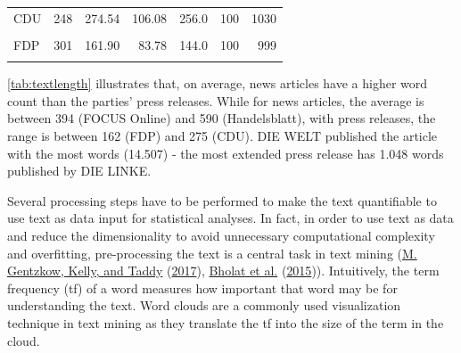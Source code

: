 \documentclass[
  12pt,
]{article}
\begin{document}
\begin{table}[H]
\begin{tabular}[t]{lrrrrrr}
\hspace{1em}CDU & 248 & 274.54 & 106.08 & 256.0 & 100 & 1030\\
\hspace{1em}\cellcolor{gray!6}{DIE LINKE} & \cellcolor{gray!6}{686} & \cellcolor{gray!6}{200.47} & \cellcolor{gray!6}{71.78} & \cellcolor{gray!6}{190.0} & \cellcolor{gray!6}{101} & \cellcolor{gray!6}{1048}\\
\hspace{1em}FDP & 301 & 161.90 & 83.78 & 144.0 & 100 & 999\\
\hspace{1em}\cellcolor{gray!6}{SPD} & \cellcolor{gray!6}{315} & \cellcolor{gray!6}{213.41} & \cellcolor{gray!6}{56.16} & \cellcolor{gray!6}{208.0} & \cellcolor{gray!6}{103} & \cellcolor{gray!6}{429}\\
\bottomrule
\end{tabular}
\end{table}

\autoref{tab:textlength} illustrates that, on average, news articles
have a higher word count than the parties' press releases. While for
news articles, the average is between 394 (FOCUS Online) and 590
(Handelsblatt), with press releases, the range is between 162 (FDP) and
275 (CDU). DIE WELT published the article with the most words (14.507) -
the most extended press release has 1.048 words published by DIE LINKE.

Several processing steps have to be performed to make the text
quantifiable to use text as data input for statistical analyses. In
fact, in order to use text as data and reduce the dimensionality to
avoid unnecessary computational complexity and overfitting,
pre-processing the text is a central task in text mining
(\protect\hyperlink{ref-gentzkow_text_2017}{M. Gentzkow, Kelly, and
Taddy} (\protect\hyperlink{ref-gentzkow_text_2017}{2017}),
\protect\hyperlink{ref-bholat_text_2015}{Bholat et al.}
(\protect\hyperlink{ref-bholat_text_2015}{2015})). Intuitively, the term
frequency (tf) of a word measures how important that word may be for
understanding the text. Word clouds are a commonly used visualization
technique in text mining as they translate the tf into the size of the
term in the cloud.
\end{document}

